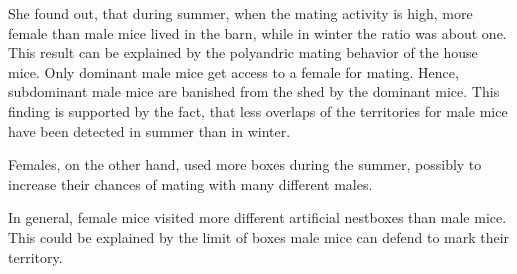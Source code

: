 She found out, that during summer, when the mating activity is high, more female than male mice lived in the barn, while in winter the ratio was about one. This result can be explained by the polyandric mating behavior of the house mice. Only dominant male mice get access to a female for mating. Hence, subdominant male mice are banished from the shed by the dominant mice. This finding is supported by the fact, that less overlaps of the territories for male mice have been detected in summer than in winter. 

Females, on the other hand, used more boxes during the summer, possibly to increase their chances of mating with many different males.

In general, female mice visited more different artificial nestboxes than male mice. This could be explained by the limit of boxes male mice can defend to mark their territory.
